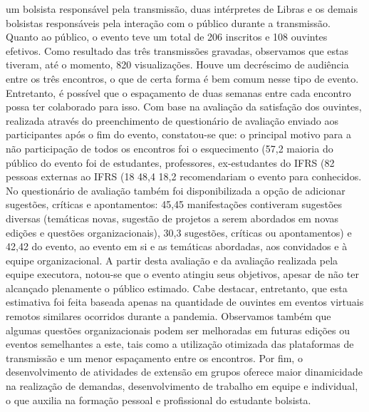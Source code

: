 um bolsista responsável pela transmissão, duas intérpretes de Libras e os demais bolsistas
responsáveis pela interação com o público durante a transmissão.
Quanto ao público, o evento teve um total de 206 inscritos e 108 ouvintes efetivos. Como
resultado das três transmissões gravadas, observamos que estas tiveram, até o momento, 820
visualizações. Houve um decréscimo de audiência entre os três encontros, o que de certa forma é
bem comum nesse tipo de evento. Entretanto, é possível que o espaçamento de duas semanas
entre cada encontro possa ter colaborado para isso.
Com base na avaliação da satisfação dos ouvintes, realizada através do preenchimento de
questionário de avaliação enviado aos participantes após o fim do evento, constatou-se que: o
principal motivo para a não participação de todos os encontros foi o esquecimento (57,2%
maioria do público do evento foi de estudantes, professores, ex-estudantes do IFRS (82%
pessoas externas ao IFRS (18%
48,4%
18,2%
recomendariam o evento para conhecidos. No questionário de avaliação também foi
disponibilizada a opção de adicionar sugestões, críticas e apontamentos: 45,45%
manifestações contiveram sugestões diversas (temáticas novas, sugestão de projetos a serem
abordados em novas edições e questões organizacionais), 30,3%
sugestões, críticas ou apontamentos) e 42,42%
do evento, ao evento em si e as temáticas abordadas, aos convidados e à equipe organizacional.
A partir desta avaliação e da avaliação realizada pela equipe executora, notou-se que o evento
atingiu seus objetivos, apesar de não ter alcançado plenamente o público estimado. Cabe
destacar, entretanto, que esta estimativa foi feita baseada apenas na quantidade de ouvintes em
eventos virtuais remotos similares ocorridos durante a pandemia. Observamos também que
algumas questões organizacionais podem ser melhoradas em futuras edições ou eventos
semelhantes a este, tais como a utilização otimizada das plataformas de transmissão e um menor
espaçamento entre os encontros. Por fim, o desenvolvimento de atividades de extensão em
grupos oferece maior dinamicidade na realização de demandas, desenvolvimento de trabalho em
equipe e individual, o que auxilia na formação pessoal e profissional do estudante bolsista.

